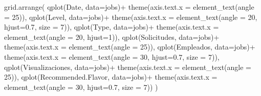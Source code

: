 \documentclass[
]{article}
\newenvironment{Shaded}{\begin{snugshade}}{\end{snugshade}}
\newcommand{\DataTypeTok}[1]{\textcolor[rgb]{0.87,0.87,0.75}{#1}}
\newcommand{\DecValTok}[1]{\textcolor[rgb]{0.86,0.86,0.80}{#1}}
\newcommand{\FloatTok}[1]{\textcolor[rgb]{0.75,0.75,0.82}{#1}}
\newcommand{\KeywordTok}[1]{\textcolor[rgb]{0.94,0.87,0.69}{#1}}
\newcommand{\NormalTok}[1]{\textcolor[rgb]{0.80,0.80,0.80}{#1}}
\newcommand{\OperatorTok}[1]{\textcolor[rgb]{0.94,0.94,0.82}{#1}}
\newcommand{\StringTok}[1]{\textcolor[rgb]{0.80,0.58,0.58}{#1}}
\begin{document}
\begin{Shaded}
\begin{Highlighting}[]
\KeywordTok{grid.arrange}\NormalTok{(}
  \KeywordTok{qplot}\NormalTok{(Date, }\DataTypeTok{data=}\NormalTok{jobs)}\OperatorTok{+}\StringTok{ }\KeywordTok{theme}\NormalTok{(}\DataTypeTok{axis.text.x =} \KeywordTok{element\_text}\NormalTok{(}\DataTypeTok{angle =} \DecValTok{25}\NormalTok{)),}
  \KeywordTok{qplot}\NormalTok{(Level, }\DataTypeTok{data=}\NormalTok{jobs)}\OperatorTok{+}\StringTok{ }\KeywordTok{theme}\NormalTok{(}\DataTypeTok{axis.text.x =} \KeywordTok{element\_text}\NormalTok{(}\DataTypeTok{angle =} \DecValTok{20}\NormalTok{, }\DataTypeTok{hjust=}\FloatTok{0.7}\NormalTok{, }\DataTypeTok{size =} \DecValTok{7}\NormalTok{)),}
  \KeywordTok{qplot}\NormalTok{(Type, }\DataTypeTok{data=}\NormalTok{jobs)}\OperatorTok{+}\StringTok{ }\KeywordTok{theme}\NormalTok{(}\DataTypeTok{axis.text.x =} \KeywordTok{element\_text}\NormalTok{(}\DataTypeTok{angle =} \DecValTok{20}\NormalTok{, }\DataTypeTok{hjust=}\DecValTok{1}\NormalTok{)),}
  \KeywordTok{qplot}\NormalTok{(Solicitudes, }\DataTypeTok{data=}\NormalTok{jobs)}\OperatorTok{+}\StringTok{ }\KeywordTok{theme}\NormalTok{(}\DataTypeTok{axis.text.x =} \KeywordTok{element\_text}\NormalTok{(}\DataTypeTok{angle =} \DecValTok{25}\NormalTok{)),}
  \KeywordTok{qplot}\NormalTok{(Empleados, }\DataTypeTok{data=}\NormalTok{jobs)}\OperatorTok{+}\StringTok{ }\KeywordTok{theme}\NormalTok{(}\DataTypeTok{axis.text.x =} \KeywordTok{element\_text}\NormalTok{(}\DataTypeTok{angle =} \DecValTok{30}\NormalTok{, }\DataTypeTok{hjust=}\FloatTok{0.7}\NormalTok{, }\DataTypeTok{size =} \DecValTok{7}\NormalTok{)),}
  \KeywordTok{qplot}\NormalTok{(Visualizaciones, }\DataTypeTok{data=}\NormalTok{jobs)}\OperatorTok{+}\StringTok{ }\KeywordTok{theme}\NormalTok{(}\DataTypeTok{axis.text.x =} \KeywordTok{element\_text}\NormalTok{(}\DataTypeTok{angle =} \DecValTok{25}\NormalTok{)),}
  \KeywordTok{qplot}\NormalTok{(Recommended.Flavor, }\DataTypeTok{data=}\NormalTok{jobs)}\OperatorTok{+}\StringTok{ }\KeywordTok{theme}\NormalTok{(}\DataTypeTok{axis.text.x =} \KeywordTok{element\_text}\NormalTok{(}\DataTypeTok{angle =} \DecValTok{30}\NormalTok{, }\DataTypeTok{hjust=}\FloatTok{0.7}\NormalTok{, }\DataTypeTok{size =} \DecValTok{7}\NormalTok{))}
\NormalTok{)}
\end{Highlighting}
\end{Shaded}
\end{document}
